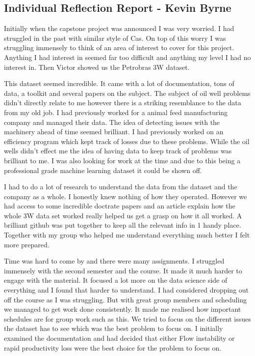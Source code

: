 \documentclass{article}
\begin{document}
\subsection{Individual Reflection Report - Kevin Byrne}
Initially when the capstone project was announced I was very worried. I had struggled in the past with similar style of Cas. On top of this worry I was struggling immensely to think of an area of interest to cover for this project. Anything I had interest in seemed far too difficult and anything my level I had no interest in. Then Victor showed us the Petrobras 3W dataset.

This dataset seemed incredible. It came with a lot of documentation, tons of data, a toolkit and several papers on the subject. The subject of oil well problems didn’t directly relate to me however there is a striking resemblance to the data from my old job. I had previously worked for a animal feed manufacturing company and managed their data. The idea of detecting issues with the machinery ahead of time seemed brilliant. I had previously worked on an efficiency program which kept track of losses due to these problems. While the oil wells didn’t effect me the idea of having data to keep track of problems was brilliant to me. I was also looking for work at the time and due to this being a professional grade machine learning dataset it could be shown off.

I had to do a lot of research to understand the data from the dataset and the company as a whole. I honestly knew nothing of how they operated. However we had access to some incredible doctrate papers and an article explain how the whole 3W data set worked really helped us get a grasp on how it all worked. A brilliant github was put together to keep all the relevant info in 1 handy place. Together with my group who helped me understand everything much better I felt more prepared. 

Time was hard to come by and there were many assignments. I struggled immensely with the second semester and the course. It made it much harder to engage with the material. It focused a lot more on the data science side of everything and I found that harder to understand. I had considered dropping out off the course as I was struggling. But with great group members and scheduling we managed to get work done consistently. It made me realised how important schedules are for group work such as this.
We tried to focus on the different issues the dataset has to see which was the best problem to focus on. I initially examined the documentation and had decided that either Flow instability or rapid productivity loss were the best choice for the problem to focus on. 
\end{document}
